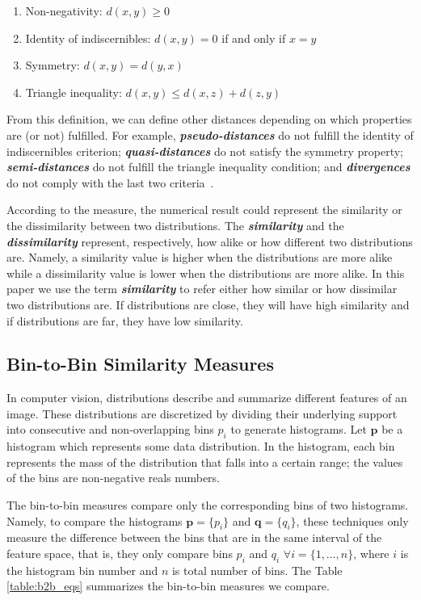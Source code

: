 \begin{enumerate}%
 \item Non-negativity: $d(x, y)\geq 0$
 \item Identity of indiscernibles: $d(x, y) = 0$ if and only if $x = y$
 \item Symmetry: $d(x, y) = d(y, x)$
 \item Triangle inequality: $d(x, y) \leq d(x, z) + d(z, y)$
\end{enumerate}

From this definition, we can define other distances depending on which properties are (or not) fulfilled. For example, \textbf{\textit{pseudo-distances}} do not fulfill the identity of indiscernibles criterion; \textbf{\textit{quasi-distances}} do not satisfy the symmetry property; \textbf{\textit{semi-distances}} do not fulfill the triangle inequality condition; and \textbf{\textit{divergences}} do not comply with the last two criteria~\citep{Khamsi:JFPTA:2015}.

According to the measure, the numerical result could represent the similarity or the dissimilarity between two distributions. The \textbf{\textit{similarity}} and the \textbf{\textit{dissimilarity}} represent, respectively, how alike or how different two distributions are. Namely, a similarity value is higher when the distributions are more alike while a dissimilarity value is lower when the distributions are more alike. In this paper we use the term \textbf{\textit{similarity}} to refer either how similar or how dissimilar two distributions are. If distributions are close, they will have high similarity and if distributions are far, they have low similarity. 
 
\subsection{Bin-to-Bin Similarity Measures}
In computer vision, distributions describe and summarize different features of an image. These distributions are discretized by dividing their underlying support into consecutive and non-overlapping bins $p_i$ to generate histograms. Let $\mathbf{p}$ be a histogram which represents some data distribution. In the histogram, each bin represents the mass of the distribution that falls into a certain range; the values of the bins are non-negative reals numbers. 

The bin-to-bin measures compare only the corresponding bins of two histograms. Namely, to compare the histograms  $\mathbf{p} = \{p_i\}$ and $\mathbf{q} = \{q_i\}$, these techniques only measure the difference between the bins that are in the same interval of the feature space, that is, they only compare bins  $p_i$ and $q_i$ $\forall i=\{1, \ldots, n\}$, where $i$ is the histogram bin number and $n$ is total number of bins. The Table \ref{table:b2b_eqs} summarizes the bin-to-bin measures we compare.

